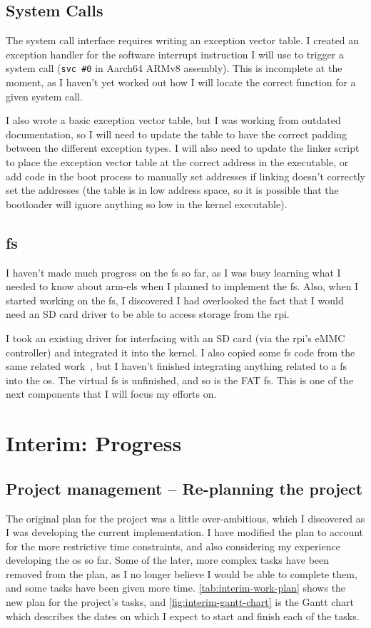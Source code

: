 \documentclass{article}
\begin{document}
\subsection{System Calls}
\label{sec:impl_syscalls}
The system call interface requires writing an exception vector table. I created
an exception handler for the software interrupt instruction I will use to
trigger a system call (\texttt{svc \#0} in Aarch64 ARMv8 assembly). This is
incomplete at the moment, as I haven't yet worked out how I will locate the
correct function for a given system call.

I also wrote a basic exception vector table, but I was working from outdated
documentation, so I will need to update the table to have the correct padding
between the different exception types. I will also need to update the linker
script to place the exception vector table at the correct address in the
executable, or add code in the boot process to manually set addresses if
linking doesn't correctly set the addresses (the table is in low address space,
so it is possible that the bootloader will ignore anything so low in the kernel
executable).

\subsection{\texorpdfstring{\gls{fs}}{Filesystem}}
\label{sec:impl_fs}
I haven't made much progress on the \gls{fs} so far, as I was busy learning
what I needed to know about \glspl{arm-el} when I planned to implement the
\gls{fs}. Also, when I started working on the \gls{fs}, I discovered I had
overlooked the fact that I would need an SD card driver to be able to access
storage from the \gls{rpi}.

I took an existing driver for interfacing with an SD card (via the \gls{rpi}'s
eMMC controller) and integrated it into the kernel. I also copied some \gls{fs}
code from the same related work~\cite{rpi-boot-gh}, but I haven't finished
integrating anything related to a \gls{fs} into the \gls{os}. The virtual
\gls{fs} is unfinished, and so is the FAT \gls{fs}. This is one of the next
components that I will focus my efforts on.


\section{Interim: Progress}
\subsection{Project management -- Re-planning the project}
The original plan for the project was a little over-ambitious, which I
discovered as I was developing the current implementation. I have modified the
plan to account for the more restrictive time constraints, and also considering
my experience developing the \gls{os} so far. Some of the later, more complex
tasks have been removed from the plan, as I no longer believe I would be able
to complete them, and some tasks have been given more time.
\autoref{tab:interim-work-plan} shows the new plan for the project's tasks, and
\autoref{fig:interim-gantt-chart} is the Gantt chart which describes the dates on which
I expect to start and finish each of the tasks.
\end{document}
